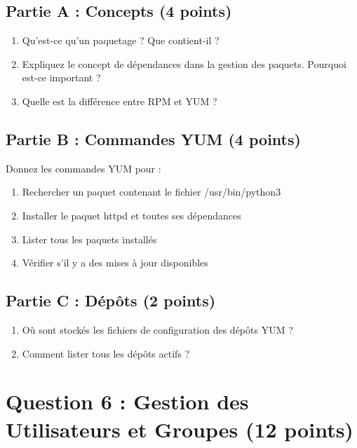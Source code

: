 \documentclass[12pt,a4paper]{article}
\begin{document}
\begin{questionbox}
\subsection*{Partie A : Concepts (4 points)}
\begin{enumerate}[label=\alph*)]
    \item Qu'est-ce qu'un paquetage ? Que contient-il ?
    \item Expliquez le concept de dépendances dans la gestion des paquets. Pourquoi est-ce important ?
    \item Quelle est la différence entre RPM et YUM ?
\end{enumerate}

\subsection*{Partie B : Commandes YUM (4 points)}
Donnez les commandes YUM pour :
\begin{enumerate}[label=\alph*)]
    \item Rechercher un paquet contenant le fichier /usr/bin/python3
    \item Installer le paquet httpd et toutes ses dépendances
    \item Lister tous les paquets installés
    \item Vérifier s'il y a des mises à jour disponibles
\end{enumerate}

\subsection*{Partie C : Dépôts (2 points)}
\begin{enumerate}[label=\alph*)]
    \item Où sont stockés les fichiers de configuration des dépôts YUM ?
    \item Comment lister tous les dépôts actifs ?
\end{enumerate}
\end{questionbox}

\newpage


\section{Question 6 : Gestion des Utilisateurs et Groupes (12 points)}
\end{document}
